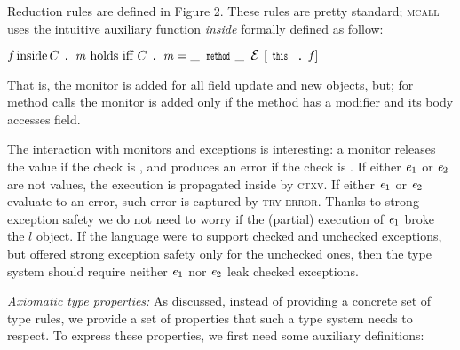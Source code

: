 \loseSpace
\noindent{}
Reduction rules are defined in Figure 2.
These rules are pretty standard;
\textsc{mcall}
uses the intuitive auxiliary function \emph{inside}
formally defined as follow:

$%
\f\, \text{inside}\, C\singleDot\m\text{ holds iff }
C\singleDot\m=\_\,\Kw{method}\_\,\ctx[\Kw{this}\singleDot\f]
$


That is, the monitor is added for all field update and new objects, but;
for method calls the monitor is added only if the method has a \Q@mut@ modifier and its body accesses \Q@capsule@ field.

The interaction with monitors and exceptions is interesting:
a monitor releases the value if the check is \Q@true@, and produces an error if the 
check is \Q@false@.
If either ${\mathit{e}}_1$ or ${\mathit{e}}_2$ are not values, the execution is propagated inside
by \textsc{ctxv}.
If either ${\mathit{e}}_1$ or ${\mathit{e}}_2$ evaluate to an error, such error is captured by 
\textsc{try error}.
Thanks to strong exception safety
we do not need to worry
if the (partial) execution of ${\mathit{e}}_1$ broke the $l$ object.
If the language were to support checked and unchecked exceptions, but offered 
strong exception safety only for the unchecked ones, then 
the type system should require neither ${\mathit{e}}_1$ nor ${\mathit{e}}_2$ leak 
checked exceptions.








\loseSpace
\noindent\textit{Axiomatic type properties:}
As discussed, instead of providing a concrete set of type rules, we provide a set of properties
that such a type system needs to respect.
To express these properties, we first need some auxiliary definitions:


